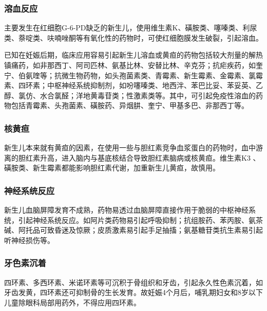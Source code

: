 \subsubsection{溶血反应}

主要发生在红细胞G-6-PD缺乏的新生儿，使用维生素K、磺胺类、噻嗪类、利尿类、萘啶类、呋喃唑酮等有氧化性的药物时，可使红细胞膜发生破裂，引起溶血。

已知在妊娠后期，临床应用容易引起新生儿溶血或黄疸的药物包括较大剂量的解热镇痛药，如非那西丁、阿司匹林、氨基比林、安替比林、辛克芬；抗疟疾药，如奎宁、伯氨喹等；抗微生物药物，如头孢菌素类、青霉素、新生霉素、金霉素、氯霉素、四环素；中枢神经系统抑制剂，如吩噻嗪类、地西泮、苯巴比妥、苯妥英、乙醇、氯仿、水合氯醛；洋地黄毒苷类；性激素类等。其中，可引起免疫性溶血的药物包括青霉素、头孢菌素、磺胺药、异烟肼、奎宁、甲基多巴、非那西丁等。

\subsubsection{核黄疸}

新生儿本来就有黄疸的因素，在使用一些与胆红素竞争血浆蛋白的药物时，血中游离的胆红素升高，进入脑内与基底核结合导致胆红素脑病或核黄疸。维生素K{3}
、磺胺类、新生霉素都能影响胆红素代谢，加重新生儿黄疸，故慎用。

\subsubsection{神经系统反应}

新生儿血脑屏障发育不成熟，药物易透过血脑屏障直接作用于脆弱的中枢神经系统，引起神经系统反应。如阿片类药物易引起呼吸抑制；抗组胺药、苯丙胺、氨茶碱、阿托品可致昏迷及惊厥；皮质激素易引起手足抽搐；氨基糖苷类抗生素易引起听神经损伤等。

\subsubsection{牙色素沉着}

四环素、多西环素、米诺环素等可沉积于骨组织和牙齿，引起永久性色素沉着，如牙齿发黄，四环素还可抑制骨的生长发育。故妊娠4个月后，哺乳期妇女和8岁以下儿童除眼科局部用药外，不得应用四环素。